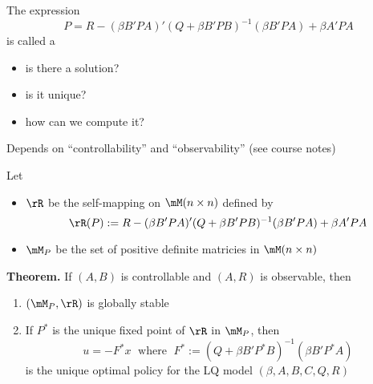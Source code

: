 \begin{frame}
    
    The expression
    \begin{equation*}
        P
        = R - (\beta B' P A)' (Q + \beta B' P B)^{-1} (\beta B' P A)
        + \beta A' P A
    \end{equation*}
    is called a 

        \vspace{0.5em}
    \begin{itemize}
        \item is there a solution?
        \vspace{0.5em}
        \item is it unique?
        \vspace{0.5em}
        \item how can we compute it?
    \end{itemize}

        \vspace{0.5em}
        \vspace{0.5em}

    Depends on ``controllability'' and ``observability'' (see course notes)
    
\end{frame}

\begin{frame}
    
    Let 
    \begin{itemize}
        \item $\rR$ be the self-mapping on $\mM(n \times n)$ defined by
            \begin{equation*}
                \rR(P) := R - (\beta B' P A)' (Q + \beta B' P B)^{-1} (\beta B' P A) + \beta A' P A
            \end{equation*}
        \item $\mM_P$ be the set of positive definite matricies in $\mM(n \times n)$
    \end{itemize}
    
        \vspace{0.5em}
    

    \textbf{Theorem.} If $(A, B)$ is controllable and $(A, R)$ is observable, then 
    \begin{enumerate}
        \item $(\mM_P, \rR)$ is globally stable
        \item If $P^*$ is the unique fixed point of $\rR$ in $\mM_P$, then 
            \begin{equation*}
                u = -F^* x 
                \; \text{ where } \;
                F^* := (Q + \beta B' P^* B)^{-1} (\beta B' P^* A )
            \end{equation*}
        is the unique optimal policy for the LQ model $(\beta, A, B, C, Q, R)$
    \end{enumerate}

\end{frame}


